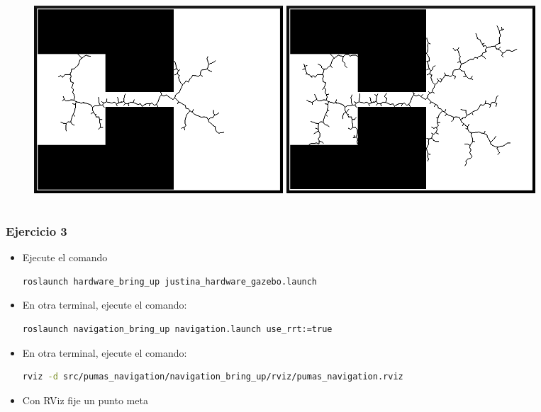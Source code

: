 \begin{frame}
\begin{columns}
\begin{column}{0.45\textwidth}
\begin{figure}
        \includegraphics[width=0.45\textwidth]{Figures/MotionPlanning/RRTO0100.png}
        \includegraphics[width=0.45\textwidth]{Figures/MotionPlanning/RRTO0300.png}
      \end{figure}
    \end{column}
  \end{columns}
\end{frame}

\begin{frame}[containsverbatim]\frametitle{Ejercicio 3}
  \begin{itemize}
  \item Ejecute el comando
    \begin{lstlisting}[language=bash]
      roslaunch hardware_bring_up justina_hardware_gazebo.launch
    \end{lstlisting}
  \item En otra terminal, ejecute el comando:
    \begin{lstlisting}[language=bash]
      roslaunch navigation_bring_up navigation.launch use_rrt:=true
    \end{lstlisting}
  \item En otra terminal, ejecute el comando:
    \begin{lstlisting}[language=bash]
    rviz -d src/pumas_navigation/navigation_bring_up/rviz/pumas_navigation.rviz
  \end{lstlisting}
  \item Con RViz fije un punto meta
  \end{itemize}
\end{frame}

